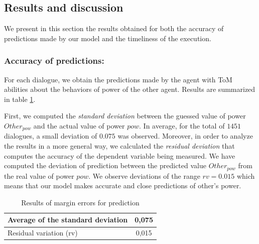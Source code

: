 \documentclass[sigconf]{aamas}  %
\begin{document}
	\subsection{Results and discussion}
	We present in this section the results obtained for both the accuracy of predictions made by our model and the timeliness of the execution.
	
	\subsubsection{Accuracy of predictions:} For each dialogue, we obtain the predictions made by the agent with ToM abilities about the behaviors of power of the other agent. Results are summarized in table \ref{tab:res1}. 
	
	First, we computed the \emph{standard deviation} between the guessed value of power $Other_{pow}$ and the actual value of power $pow$. In average, for the total of $1451$ dialogues, a small deviation of $0.075$ was observed. Moreover, in order to analyze the results in a more general way, we calculated the \emph{residual deviation }  that computes the accuracy of the dependent variable being measured. We have computed the deviation of prediction between the predicted value  $Other_{pow}$ from the real value of power $pow$. 
	We observe deviations of the range $rv = 0.015$ which means that our model makes accurate and close predictions of other's power.
	
	
	\begin{table}[h]
		\centering
		\caption{Results of margin errors for prediction} 
		\begin{tabular}{|l|c|}
			\hline
			Average of the standard deviation & 0,075 \\
			\hline
			Residual variation (rv) & 0,015 \\
			\hline
		\end{tabular}
		
		\label{tab:res1}
	\end{table}
	
\end{document}
